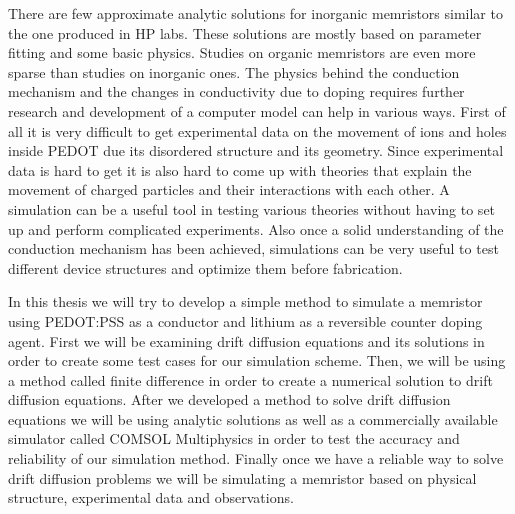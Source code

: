 There are few approximate analytic solutions for inorganic memristors similar to the one produced in HP labs. These solutions are mostly based on parameter fitting and some basic physics. Studies on organic memristors are even more sparse than studies on inorganic ones. The physics behind the conduction mechanism and the changes in conductivity due to doping requires further research and development of a computer model can help in various ways. First of all it is very difficult to get experimental data on the movement of ions and holes inside PEDOT due its disordered structure and its geometry. Since experimental data is hard to get it is also hard to come up with theories that explain the movement of charged particles and their interactions with each other. A simulation can be a useful tool in testing various theories without having to set up and perform complicated experiments. Also once a solid understanding of the conduction mechanism has been achieved, simulations can be very useful to test different device structures and optimize them before fabrication. 

In this thesis we will try to develop a simple method to simulate a memristor using PEDOT:PSS as a conductor and lithium as a reversible counter doping agent. First we will be examining drift diffusion equations and its solutions in order to create some test cases for our simulation scheme. Then, we will be using a method called finite difference in order to create a numerical solution to drift diffusion equations. After we developed a method to solve drift diffusion equations we will be using analytic solutions as well as a commercially available simulator called COMSOL Multiphysics in order to test the accuracy and reliability of our simulation method. Finally once we have a reliable way to solve drift diffusion problems we will be simulating a memristor based on physical structure, experimental data and observations.

 